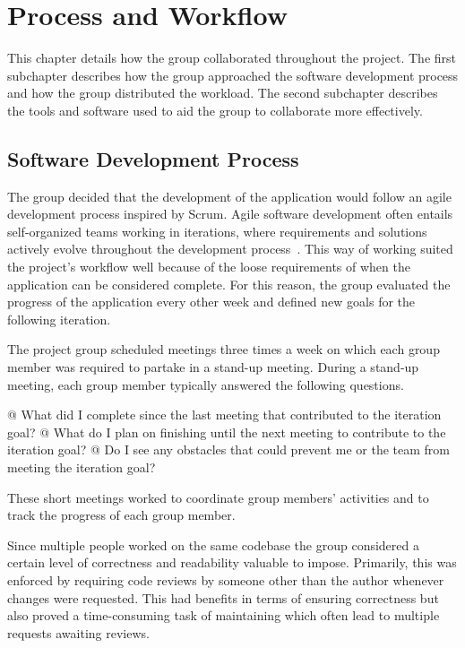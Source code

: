 \section{Process and Workflow}
This chapter details how the group collaborated throughout the project.
The first subchapter describes how the group approached the software development process and how the group distributed the workload.
The second subchapter describes the tools and software used to aid the group to collaborate more effectively.

\subsection{Software Development Process}
The group decided that the development of the application would follow an agile development process inspired by Scrum.
Agile software development often entails self-organized teams working in iterations, where requirements and solutions actively evolve throughout the development process~\cite{agile101}.
This way of working suited the project's workflow well because of the loose requirements of when the application can be considered complete.
For this reason, the group evaluated the progress of the application every other week and defined new goals for the following iteration.

The project group scheduled meetings three times a week on which each group member was required to partake in a stand-up meeting.
During a stand-up meeting, each group member typically answered the following questions.

\begin{easylist}
  @ What did I complete since the last meeting that contributed to the iteration goal?
  @ What do I plan on finishing until the next meeting to contribute to the iteration goal?
  @ Do I see any obstacles that could prevent me or the team from meeting the iteration goal?
\end{easylist}

These short meetings worked to coordinate group members' activities and to track the progress of each group member.

Since multiple people worked on the same codebase the group considered a certain level of correctness and readability valuable to impose.
Primarily, this was enforced by requiring code reviews by someone other than the author whenever changes were requested.
This had benefits in terms of ensuring correctness but also proved a time-consuming task of maintaining which often lead to multiple requests awaiting reviews.

